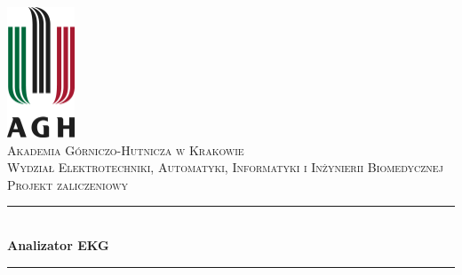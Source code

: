 \documentclass[a4paper, 11pt]{article}
\newcommand{\HRule}{\rule{\linewidth}{0.5mm}}
\begin{document}
\begin{titlepage}
\begin{center}

\includegraphics[width=0.15\textwidth]{./include/agh-logo}~\\[1cm]

\textsc{\LARGE Akademia Górniczo-Hutnicza w Krakowie}\\
\textsc{\Large Wydział Elektrotechniki, Automatyki, Informatyki i Inżynierii Biomedycznej}\\
[1.5cm]

\textsc{\Large Projekt zaliczeniowy}\\[0.5cm]

\HRule \\[0.4cm]
{ \huge \bfseries Analizator EKG}\\[0.4cm]

\HRule \\[1.5cm]


\end{center}
\end{titlepage}
\end{document}
